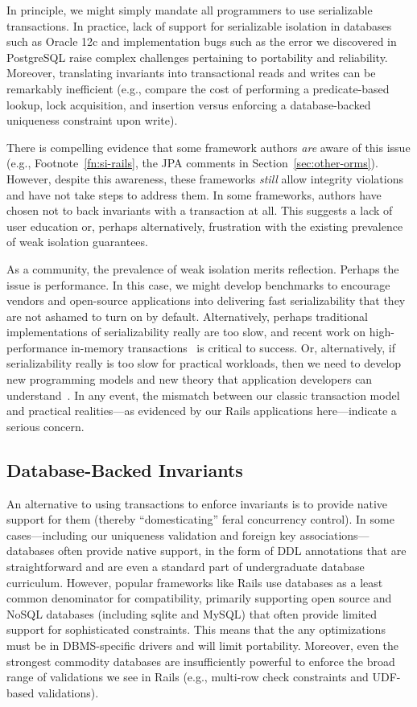 In principle, we might simply mandate all programmers to use
serializable transactions. In practice, lack of support for
serializable isolation in databases such as Oracle 12c and
implementation bugs such as the error we discovered in PostgreSQL
raise complex challenges pertaining to portability and
reliability. Moreover, translating invariants into transactional reads and writes
can be remarkably inefficient (e.g., compare the cost of performing a
predicate-based lookup, lock acquisition, and insertion versus
enforcing a database-backed uniqueness constraint upon write).

There is compelling evidence that some framework authors \textit{are}
aware of this issue (e.g., Footnote~\ref{fn:si-rails}, the JPA
comments in Section~\ref{sec:other-orms}). However, despite this
awareness, these frameworks \textit{still} allow integrity violations
and have not take steps to address them. In some frameworks, authors
have chosen not to back invariants with a transaction at all. This
suggests a lack of user education or, perhaps alternatively,
frustration with the existing prevalence of weak isolation guarantees.

As a community, the prevalence of weak isolation merits
reflection. Perhaps the issue is performance. In this case, we might
develop benchmarks to encourage vendors and open-source applications
into delivering fast serializability that they are not ashamed to turn
on by default. Alternatively, perhaps traditional implementations of
serializability really are too slow, and recent work on
high-performance in-memory transactions~\cite{hekaton,hstore} is
critical to success. Or, alternatively, if serializability really is
too slow for practical workloads, then we need to develop new
programming models and new theory that application developers can
understand~\cite{coord-avoid,calm,redblue-new,writes-forest}. In any
event, the mismatch between our classic transaction model and
practical realities---as evidenced by our Rails applications
here---indicate a serious concern.

\subsection{Database-Backed Invariants}

An alternative to using
transactions to enforce invariants is to provide native support for
them (thereby ``domesticating'' feral concurrency control). In some
cases---including our uniqueness validation and foreign key
associations---databases often provide native support, in the form of
DDL annotations that are straightforward and are even a standard part
of undergraduate database curriculum. However, popular frameworks like
Rails use databases as a least common denominator for compatibility,
primarily supporting open source and NoSQL databases (including sqlite
and MySQL) that often provide limited support for sophisticated
constraints. This means that the any optimizations must be in
DBMS-specific drivers and will limit portability. Moreover, even the
strongest commodity databases are insufficiently powerful to enforce
the broad range of validations we see in Rails (e.g., multi-row check
constraints and UDF-based validations).

